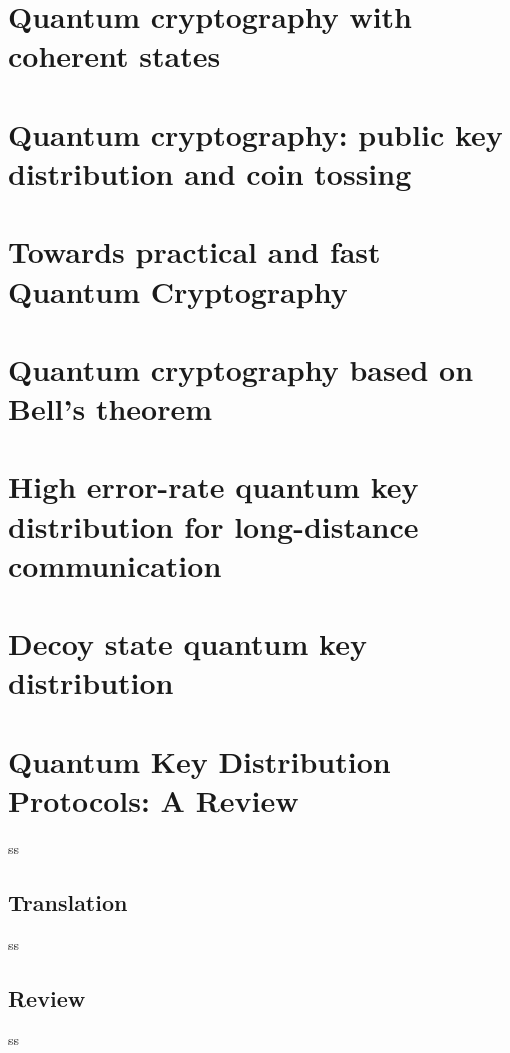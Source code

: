 

\newcommand{\trnas}{Translation}
\newcommand{\dic}{Dictionary}
\newcommand{\review}{Review}




\tableofcontents
\clearpage
\section{Quantum cryptography with coherent states}

%
\section{Quantum cryptography: public key distribution and coin tossing}



\section{Towards practical and fast Quantum Cryptography}



\section{Quantum cryptography based on Bell's theorem}



\section{High error-rate quantum key distribution for long-distance communication }



\section{Decoy state quantum key distribution}




\section{Quantum Key Distribution Protocols: A Review}
ss
\subsection*{\trnas}
ss
\subsection*{\review}
ss
